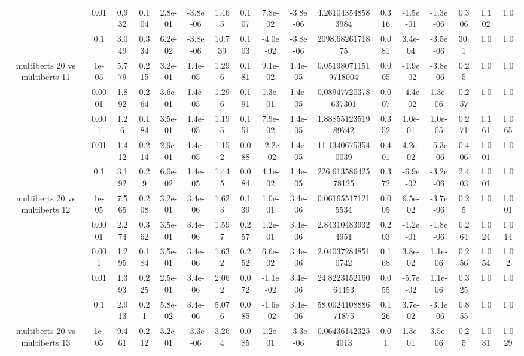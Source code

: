 \begin{tabular}{|c|c|c|c|c|c|c|c|c|c|c|c|c|c|c|c|c|}
 & 0.01 & 0.932 & 0.104 & 2.8e-01 & -3.8e-06 & 1.465 & 0.107 & 7.8e-02 & -3.8e-06 & 4.261043548583984 & 0.316 & -1.5e-01 & -1.3e-06 & 0.306 & 1.102 & 1.0 \\
 & 0.1 & 3.049 & 0.334 & 6.2e-02 & -3.8e-06 & 10.739 & 0.103 & -4.0e-02 & -3.8e-06 & 2098.6826171875 & 0.081 & 3.4e-04 & -3.5e-06 & 30.1 & 1.0 & 1.0 \\
\hline
\multirow{5}{*}{multiberts 20 vs multiberts 11} & 1e-05 & 5.779 & 0.215 & 3.2e-01 & 1.4e-05 & 1.296 & 0.181 & 9.1e-02 & 1.4e-05 & 0.051980711519718004 & 0.005 & -1.9e-02 & -3.8e-06 & 0.25 & 1.0 & 1.0 \\
 & 0.0001 & 1.892 & 0.264 & 3.6e-01 & 1.4e-05 & 1.296 & 0.191 & 1.3e-01 & 1.4e-05 & 0.08947720378637301 & 0.007 & -4.4e-02 & 1.3e-06 & 0.257 & 1.0 & 1.0 \\
 & 0.001 & 1.26 & 0.184 & 3.5e-01 & 1.4e-05 & 1.195 & 0.151 & 7.9e-02 & 1.4e-05 & 1.8885512351989742 & 0.352 & 1.0e-01 & 1.0e-05 & 0.271 & 1.161 & 1.065 \\
 & 0.01 & 1.412 & 0.214 & 2.9e-01 & 1.4e-05 & 1.152 & 0.088 & -2.2e-02 & 1.4e-05 & 11.13406753540039 & 0.401 & 4.2e-02 & -5.3e-06 & 0.406 & 1.001 & 1.0 \\
 & 0.1 & 3.192 & 0.29 & 6.0e-02 & 1.4e-05 & 1.445 & 0.084 & 4.1e-02 & 1.4e-05 & 226.61358642578125 & 0.372 & -6.9e-02 & -3.2e-06 & 2.403 & 1.001 & 1.0 \\
\hline
\multirow{5}{*}{multiberts 20 vs multiberts 12} & 1e-05 & 7.565 & 0.208 & 3.2e-01 & 3.4e-06 & 1.623 & 0.139 & 1.0e-01 & 3.4e-06 & 0.061655171215534 & 0.005 & 6.5e-02 & -3.7e-06 & 0.25 & 1.0 & 1.001 \\
 & 0.0001 & 2.274 & 0.362 & 3.5e-01 & 3.4e-06 & 1.597 & 0.257 & 1.2e-01 & 3.4e-06 & 2.843104839324951 & 0.203 & -1.2e-01 & -1.8e-06 & 0.264 & 1.024 & 1.014 \\
 & 0.001 & 1.295 & 0.184 & 3.5e-01 & 3.4e-06 & 1.632 & 0.252 & 6.6e-02 & 3.4e-06 & 2.040372848510742 & 0.168 & 3.8e-02 & 1.1e-06 & 0.256 & 1.054 & 1.02 \\
 & 0.01 & 1.393 & 0.225 & 2.5e-01 & 3.4e-06 & 2.062 & 0.072 & -1.1e-02 & 3.4e-06 & 24.822315216064453 & 0.055 & -5.7e-02 & 1.1e-06 & 0.325 & 1.0 & 1.0 \\
 & 0.1 & 2.913 & 0.21 & 5.8e-02 & 3.4e-06 & 5.076 & 0.085 & -1.6e-02 & 3.4e-06 & 58.002410888671875 & 0.126 & 3.7e-02 & -3.4e-06 & 0.855 & 1.0 & 1.0 \\
\hline
\multirow{5}{*}{multiberts 20 vs multiberts 13} & 1e-05 & 9.461 & 0.212 & 3.2e-01 & -3.3e-06 & 3.264 & 0.085 & 1.2e-01 & -3.3e-06 & 0.064361423254013 & 0.01 & 1.3e-01 & 3.5e-06 & 0.25 & 1.031 & 1.029 \\

\end{tabular}

